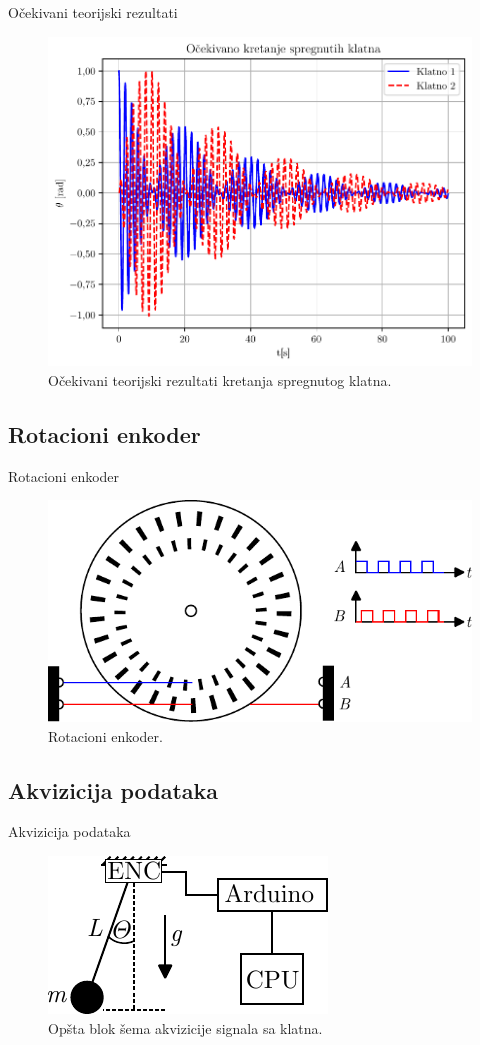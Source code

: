 \documentclass[aspectratio=169,xcolor=dvipsnames]{beamer}
\begin{document}
\begin{frame}{Očekivani teorijski rezultati}
    \begin{figure}
    \includegraphics[width=0.5\linewidth]{master_fig/spregnuto_mat.pdf}
    \caption{Očekivani teorijski rezultati kretanja spregnutog klatna.}
    \end{figure}
\end{frame}


\subsection{Rotacioni enkoder}

\begin{frame}{Rotacioni enkoder}
    \begin{figure}
    \includegraphics[width=0.6\linewidth]{master_fig/enc.pdf}
    \caption{Rotacioni enkoder.}
    \end{figure}
\end{frame}

\subsection{Akvizicija podataka}

\begin{frame}{Akvizicija podataka}
    \begin{figure}
    \includegraphics[width=0.6\linewidth]{master_fig/akvizicija.pdf}
    \caption{Opšta blok šema akvizicije signala sa klatna.}
    \end{figure}
\end{frame}
\end{document}
